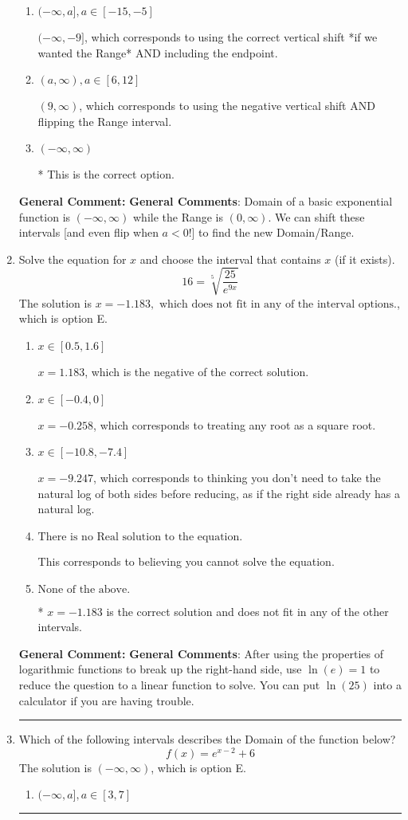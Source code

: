 \documentclass{extbook}[14pt]
\newcommand{\litem}[1]{\item #1

\rule{\textwidth}{0.4pt}}
\begin{document}
\begin{enumerate}
{\begin{enumerate}[label=\Alph*.]
$[9, \infty)$, which corresponds to using the negative vertical shift AND flipping the Range interval AND including the endpoint.
\item \( (-\infty, a], a \in [-15, -5] \)

$(-\infty, -9]$, which corresponds to using the correct vertical shift *if we wanted the Range* AND including the endpoint.
\item \( (a, \infty), a \in [6, 12] \)

$(9, \infty)$, which corresponds to using the negative vertical shift AND flipping the Range interval.
\item \( (-\infty, \infty) \)

* This is the correct option.
\end{enumerate}

\textbf{General Comment:} \textbf{General Comments}: Domain of a basic exponential function is $(-\infty, \infty)$ while the Range is $(0, \infty)$. We can shift these intervals [and even flip when $a<0$!] to find the new Domain/Range.
}
\litem{
 Solve the equation for $x$ and choose the interval that contains $x$ (if it exists).
\[  16 = \sqrt[5]{\frac{25}{e^{9x}}} \]The solution is \( x = -1.183, \text{ which does not fit in any of the interval options.} \), which is option E.\begin{enumerate}[label=\Alph*.]
\item \( x \in [0.5, 1.6] \)

$x = 1.183$, which is the negative of the correct solution.
\item \( x \in [-0.4, 0] \)

$x = -0.258$, which corresponds to treating any root as a square root.
\item \( x \in [-10.8, -7.4] \)

$x = -9.247$, which corresponds to thinking you don't need to take the natural log of both sides before reducing, as if the right side already has a natural log.
\item \( \text{There is no Real solution to the equation.} \)

This corresponds to believing you cannot solve the equation.
\item \( \text{None of the above.} \)

* $x = -1.183$ is the correct solution and does not fit in any of the other intervals.
\end{enumerate}

\textbf{General Comment:} \textbf{General Comments}: After using the properties of logarithmic functions to break up the right-hand side, use $\ln(e) = 1$ to reduce the question to a linear function to solve. You can put $\ln(25)$ into a calculator if you are having trouble.
}
\litem{
Which of the following intervals describes the Domain of the function below?
\[ f(x) = e^{x-2}+6 \]The solution is \( (-\infty, \infty) \), which is option E.\begin{enumerate}[label=\Alph*.]
\item \( (-\infty, a], a \in [3, 7] \)


\end{enumerate}}
\end{enumerate}
\end{document}
